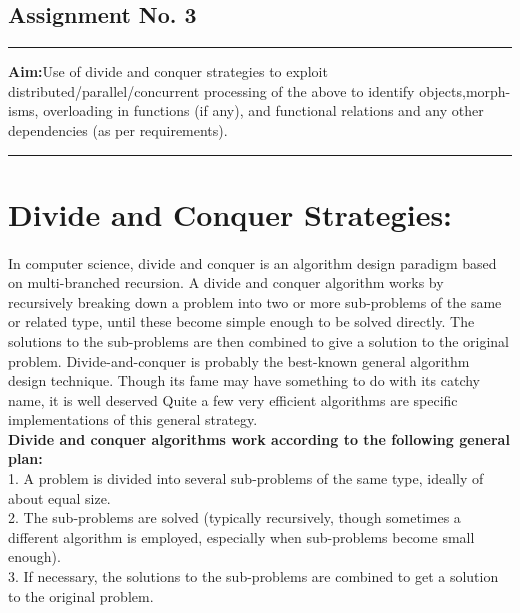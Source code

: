 \documentclass[11pt,a4paper]{report}
\begin{document}
\begin{center}
\section*{Assignment No. 3}
\end{center}
\rule{\textwidth}{1pt}
\textbf{Aim:}Use of divide and conquer strategies to exploit distributed/parallel/concurrent processing of the above to identify objects,morph-isms, overloading in functions (if any), and functional relations and any other dependencies (as per requirements).\\
\rule{\textwidth}{1pt}
\section*{Divide and Conquer Strategies:}
\paragraph{}In computer science, divide and conquer is an algorithm design paradigm based on multi-branched recursion. A divide and conquer algorithm works by recursively breaking down a problem into two or more sub-problems of the same or related type, until these become simple enough to be solved directly. The solutions to the sub-problems are then combined to give a solution to the original problem. Divide-and-conquer is probably the best-known general algorithm design technique. Though its fame may have something to do with its catchy name, it is well deserved Quite a few very efficient algorithms are specific implementations of this general strategy.\\

\textbf{Divide and conquer algorithms work according to the following general plan:\\}
1. A problem is divided into several sub-problems of the same type, ideally of about equal size.\\
2. The sub-problems are solved (typically recursively, though sometimes a different algorithm is employed, especially when sub-problems become small enough).\\
3. If necessary, the solutions to the sub-problems are combined to get a solution to the original problem.\\
\end{document}
